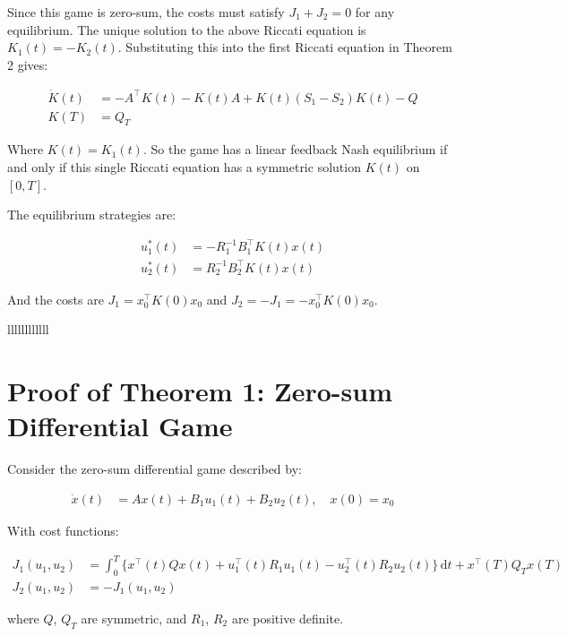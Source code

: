 \documentclass[3p]{elsarticle}
\begin{document}
Since this game is zero-sum, the costs must satisfy $J_1 + J_2 = 0$ for any equilibrium. The unique solution to the above Riccati equation is $K_1(t) = -K_2(t)$. Substituting this into the first Riccati equation in Theorem 2 gives:

\begin{align*} 
\dot{K}(t) &= -A^\top K(t) - K(t)A + K(t)(S_1-S_2)K(t) - Q \\
K(T) &= Q_T
\end{align*}

Where $K(t) = K_1(t)$. So the game has a linear feedback Nash equilibrium if and only if this single Riccati equation has a symmetric solution $K(t)$ on $[0,T]$. 

The equilibrium strategies are:

\begin{align*}
u_1^*(t) &= -R_1^{-1}B_1^\top K(t) x(t) \\ 
u_2^*(t) &= R_2^{-1}B_2^\top K(t) x(t)
\end{align*}

And the costs are $J_1 = x_0^\top K(0) x_0$ and $J_2 = -J_1 = -x_0^\top K(0) x_0$.


llllllllllll

\section{Proof of Theorem 1: Zero-sum Differential Game}

Consider the zero-sum differential game described by:

\begin{align*}
\dot{x}(t) &= Ax(t) + B_1u_1(t) + B_2u_2(t), \quad x(0)=x_0
\end{align*}

With cost functions:

\begin{align*}
J_1(u_1,u_2) &= \int_0^T \{x^\top (t)Qx(t) + u_1^\top(t) R_1u_1(t) - u_2^\top(t)R_2u_2(t)\}\,\mathrm{d}t + x^\top(T)Q_Tx(T) \\
J_2(u_1,u_2) &= -J_1(u_1,u_2)
\end{align*}

where $Q$, $Q_T$ are symmetric, and $R_1$, $R_2$ are positive definite.
\end{document}
